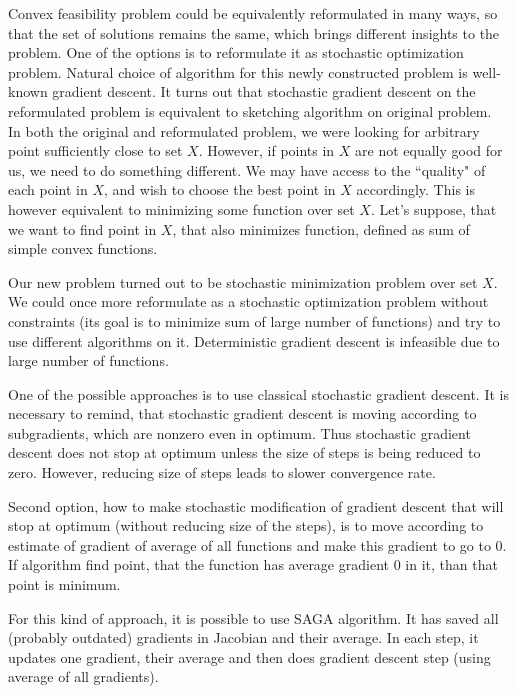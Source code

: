 \documentclass[11pt]{book}
\theoremstyle{definition}
\begin{document}
	Convex feasibility problem could be equivalently reformulated in many ways, so that the set of solutions remains the same, which brings different insights to the problem. One of the options is to reformulate it as stochastic optimization problem. Natural choice of algorithm for this newly constructed problem is well-known gradient descent. It turns out that stochastic gradient descent on the reformulated problem is equivalent to sketching algorithm on original problem\cite{sketchAndProject,projectionFeasibility}.\\
	
	In both the original and reformulated problem, we were looking for arbitrary point sufficiently close to set $X$. However, if points in $X$ are not equally good for us, we need to do something different. We may have access to the ``quality" of each point in $X$, and wish to choose the best point in $X$ accordingly. This is however equivalent to minimizing some function over set $X$. Let's suppose, that we want to find point in $X$, that also minimizes function, defined as sum of simple convex functions.
	
	Our new problem turned out to be stochastic minimization problem over set $X$. We could once more reformulate as a stochastic optimization problem without constraints (its goal is to minimize sum of large number of functions) and try to use different algorithms on it\cite{kosto}. Deterministic gradient descent is infeasible due to large number of functions.
	
	One of the possible approaches is to use classical stochastic gradient descent. It is necessary to remind, that stochastic gradient descent is moving according to subgradients, which are nonzero even in optimum. Thus stochastic gradient descent does not stop at optimum unless the size of steps is being reduced to zero. However, reducing size of steps leads to slower convergence rate\cite{SGD}.
	
	Second option, how to make stochastic modification of gradient descent that will stop at optimum (without reducing size of the steps), is to move according to estimate of gradient of average of all functions and make this gradient to go to $0$. If algorithm find point, that the function has average gradient $0$  in it, than that point is minimum. 
	
	For this kind of approach, it is possible to use SAGA algorithm\cite{SAGA}. It has saved all (probably outdated) gradients in Jacobian and their average. In each step, it updates one gradient, their average and then does gradient descent step (using average of all gradients). 
	
\end{document}
